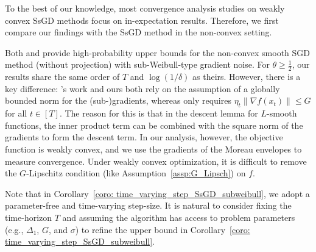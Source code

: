 \documentclass{article}
\begin{document}
To the best of our knowledge, most convergence analysis studies on weakly convex SsGD methods focus on in-expectation results. Therefore, we first compare our findings with the SsGD method in the non-convex setting. 

Both \citep{madden2020high} and \citep{li_2022} provide high-probability upper bounds for the non-convex smooth SGD method (without projection) with sub-Weibull-type gradient noise. For $\theta \geq \frac{1}{2}$, our results share the same order of $T$ and $\log(1/\delta)$ as theirs. However, there is a key difference: \citep{madden2020high}'s work and ours both rely on the assumption of a globally bounded norm for the (sub-)gradients, whereas \citep{lishaojie_liuyong_2022} only requires $\eta_t\|\nabla f(x_t)\| \leq G$ for all $t \in [T]$. The reason for this is that in the descent lemma for $L$-smooth functions, the inner product term can be combined with the square norm of the gradients to form the descent term. In our analysis, however, the objective function is weakly convex, and we use the gradients of the Moreau envelopes to measure convergence. Under weakly convex optimization, it is difficult to remove the $G$-Lipschitz condition (like Assumption~\ref{assp:G_Lipsch}) on $f$.

Note that in Corollary~\ref{coro: time_varying_step_SsGD_subweibull}, we adopt a parameter-free and time-varying step-size. It is natural to consider fixing the time-horizon $T$ and assuming the algorithm has access to problem parameters (e.g., $\Delta_1$, $G$, and $\sigma$) to refine the upper bound in Corollary~\ref{coro: time_varying_step_SsGD_subweibull}.
\end{document}
